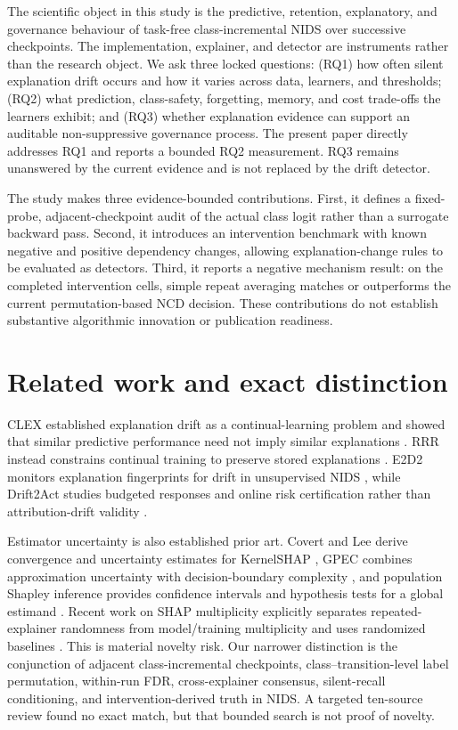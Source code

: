 \documentclass[10pt]{article}
\newcommand{\ncd}{\textsc{NCD}}
\begin{document}
The scientific object in this study is the predictive, retention,
explanatory, and governance behaviour of task-free class-incremental NIDS over
successive checkpoints.  The implementation, explainer, and detector are
instruments rather than the research object.  We ask three locked questions:
(RQ1) how often silent explanation drift occurs and how it varies across data,
learners, and thresholds; (RQ2) what prediction, class-safety, forgetting,
memory, and cost trade-offs the learners exhibit; and (RQ3) whether explanation
evidence can support an auditable non-suppressive governance process.  The
present paper directly addresses RQ1 and reports a bounded RQ2 measurement.
RQ3 remains unanswered by the current evidence and is not replaced by the
drift detector.

The study makes three evidence-bounded contributions.  First, it defines a
fixed-probe, adjacent-checkpoint audit of the actual class logit rather than a
surrogate backward pass.  Second, it introduces an intervention benchmark with
known negative and positive dependency changes, allowing explanation-change
rules to be evaluated as detectors.  Third, it reports a negative mechanism
result: on the completed intervention cells, simple repeat averaging matches or
outperforms the current permutation-based \ncd{} decision.  These contributions
do not establish substantive algorithmic innovation or publication readiness.

\section{Related work and exact distinction}

CLEX established explanation drift as a continual-learning problem and showed
that similar predictive performance need not imply similar explanations
\cite{cossu2024clex}.  RRR instead constrains continual training to preserve
stored explanations \cite{ebrahimi2021rrr}.  E2D2 monitors explanation
fingerprints for drift in unsupervised NIDS \cite{nugraha2026e2d2}, while
Drift2Act studies budgeted responses and online risk certification rather than
attribution-drift validity \cite{lamaakal2026drift2act}.

Estimator uncertainty is also established prior art.  Covert and Lee derive
convergence and uncertainty estimates for KernelSHAP \cite{covert2021kernel},
GPEC combines approximation uncertainty with decision-boundary complexity
\cite{hill2024gpec}, and population Shapley inference provides confidence
intervals and hypothesis tests for a global estimand
\cite{williamson2020spvim}.  Recent work on SHAP multiplicity explicitly
separates repeated-explainer randomness from model/training multiplicity and
uses randomized baselines \cite{hwang2026multiplicity}.  This is material
novelty risk.  Our narrower distinction is the conjunction of adjacent
class-incremental checkpoints, class--transition-level label permutation,
within-run FDR, cross-explainer consensus, silent-recall conditioning, and
intervention-derived truth in NIDS.  A targeted ten-source review found no
exact match, but that bounded search is not proof of novelty.
\end{document}
